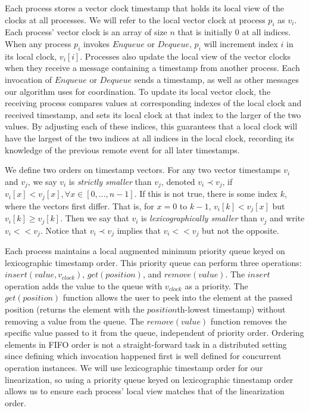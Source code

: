 \documentclass[a4paper,anonymous,USenglish]{lipics-v2021} %
\theoremstyle{definition}
\begin{document}
Each process stores a vector clock timestamp that holds its local view of the clocks at all processes.  We will refer to the local vector clock at process $p_i$ as $v_i$.  Each process' vector clock is an array of size $n$ that is initially 0 at all indices.  When any process $p_i$ invokes $Enqueue$ or $Dequeue$, $p_i$ will increment index $i$ in its local clock, $v_i[i]$.  Processes also update the local view of the vector clocks when they receive a message containing a timestamp from another process.  Each invocation of $Enqueue$ or $Dequeue$ sends a timestamp, as well as other messages our algorithm uses for coordination.  To update its local vector clock, the receiving process compares values at corresponding indexes of the local clock and received timestamp, and sets its local clock at that index to the larger of the two values.  By adjusting each of these indices, this guarantees that a local clock will have the largest of the two indices at all indices in the local clock, recording its knowledge of the previous remote event for all later timestamps.

We define two orders on timestamp vectors.  For any two vector timestamps $v_i$ and $v_j$, we say $v_i$ is \emph{strictly smaller} than $v_j$, denoted $v_i \prec  v_j$, if $v_i[x] < v_j[x],\forall x \in [0, \dots, n-1]$.  If this is not true, there is some index $k$, where the vectors first differ.  That is, for $x = 0$ to $k-1$, $v_i[k] < v_j[x]$ but $v_i[k] \geq v_j [k]$.  Then we say that $v_i$ is \emph{lexicographically smaller} than $v_j$ and write $v_i << v_j$.  Notice that $v_i \prec v_j$ implies that $v_i << v_j$ but not the opposite.

Each process maintains a local augmented minimum priority queue keyed on lexicographic timestamp order.  This priority queue can perform three operations: $insert(value, v_{clock})$, $get(position)$, and $remove(value)$.  The $insert$ operation adds the value to the queue with $v_{clock}$ as a priority.  The $get(position)$ function allows the user to peek into the element at the passed position (returns the element with the $position$th-lowest timestamp) without removing a value from the queue.  The $remove(value)$ function removes the specific value passed to it from the queue, independent of priority order.  Ordering elements in FIFO order is not a straight-forward task in a distributed setting since defining which invocation happened first is well defined for concurrent operation instances.  We will use lexicographic timestamp order for our linearization, so using a priority queue keyed on lexicographic timestamp order allows us to ensure each process' local view matches that of the linearization order.
\end{document}
